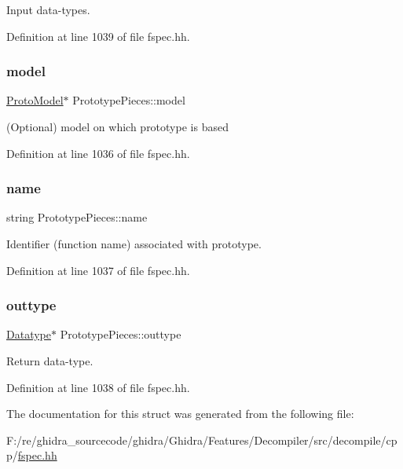 Input data-\/types. 



Definition at line 1039 of file fspec.\+hh.

\mbox{\label{struct_prototype_pieces_a35b3c9fbc711e8623021f4e21284de13}} 
\subsubsection{\texorpdfstring{model}{model}}
{\footnotesize\ttfamily \mbox{\hyperlink{class_proto_model}{Proto\+Model}}$\ast$ Prototype\+Pieces\+::model}



(Optional) model on which prototype is based 



Definition at line 1036 of file fspec.\+hh.

\mbox{\label{struct_prototype_pieces_ac0eadd4acbffa119e16210b39e32623e}} 
\subsubsection{\texorpdfstring{name}{name}}
{\footnotesize\ttfamily string Prototype\+Pieces\+::name}



Identifier (function name) associated with prototype. 



Definition at line 1037 of file fspec.\+hh.

\mbox{\label{struct_prototype_pieces_ab145dec69a82cf13bef723679f6800b0}} 
\subsubsection{\texorpdfstring{outtype}{outtype}}
{\footnotesize\ttfamily \mbox{\hyperlink{class_datatype}{Datatype}}$\ast$ Prototype\+Pieces\+::outtype}



Return data-\/type. 



Definition at line 1038 of file fspec.\+hh.



The documentation for this struct was generated from the following file\+:\begin{DoxyCompactItemize}
\item 
F\+:/re/ghidra\+\_\+sourcecode/ghidra/\+Ghidra/\+Features/\+Decompiler/src/decompile/cpp/\mbox{\hyperlink{fspec_8hh}{fspec.\+hh}}\end{DoxyCompactItemize}
